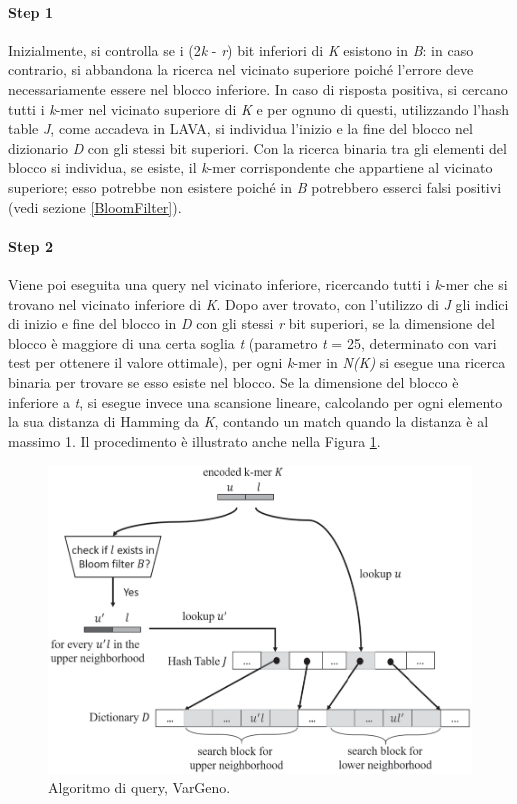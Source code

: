 \documentclass[../main.tex]{subfiles}
\begin{document}
\paragraph{Step 1} Inizialmente, si controlla se i (2\textit{k} - \textit{r}) bit inferiori di \textit{K} esistono in \textit{B}: in caso contrario, si abbandona la ricerca nel vicinato superiore poiché l'errore deve necessariamente essere nel blocco inferiore. In caso di risposta positiva, si cercano tutti i \textit{k}-mer nel vicinato superiore di \textit{K} e per ognuno di questi, utilizzando l'hash table \textit{J}, come accadeva in LAVA, si individua l'inizio e la fine del blocco nel dizionario \textit{D} con gli stessi bit superiori. Con la ricerca binaria tra gli elementi del blocco si individua, se esiste, il \textit{k}-mer corrispondente che appartiene al vicinato superiore; esso potrebbe non esistere poiché in \textit{B} potrebbero esserci falsi positivi (vedi sezione \ref{BloomFilter}).

\paragraph{Step 2} Viene poi eseguita una query nel vicinato inferiore, ricercando tutti i \textit{k}-mer che si trovano nel vicinato inferiore di \textit{K}. Dopo aver trovato, con l'utilizzo di \textit{J} gli indici di inizio e fine del blocco in \textit{D} con gli stessi \textit{r} bit superiori, se la dimensione del blocco è maggiore di una certa soglia \textit{t} (parametro \textit{t} = 25, determinato con vari test per ottenere il valore ottimale), per ogni \textit{k}-mer in \textit{N(K)} si esegue una ricerca binaria per trovare se esso esiste nel blocco. Se la dimensione del blocco è inferiore a \textit{t}, si esegue invece una scansione lineare, calcolando per ogni elemento la sua distanza di Hamming da \textit{K}, contando un match quando la distanza è al massimo 1. Il procedimento è illustrato anche nella Figura \ref{fig:vargeno}.

\begin{figure}[h!]
	\centering
  	\captionsetup{justification=centering}
 	\includegraphics[scale=.40]{images/vargeno-query.png}
  	\caption{Algoritmo di query, VarGeno.}
  	\label{fig:vargeno}
\end{figure}
\end{document}
